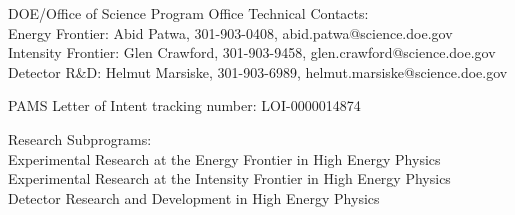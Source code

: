 \begin{center}
DOE/Office of Science Program Office Technical Contacts:  \\
Energy Frontier: Abid Patwa, 301-903-0408, abid.patwa@science.doe.gov \\
Intensity Frontier: Glen Crawford, 301-903-9458, glen.crawford@science.doe.gov  \\
Detector R\&D: Helmut Marsiske, 301-903-6989, helmut.marsiske@science.doe.gov  \\
\vspace*{0.15in}

PAMS Letter of Intent tracking number:  LOI-0000014874
\vspace*{0.15in}

Research Subprograms:  \\
Experimental Research at the Energy Frontier in High Energy Physics  \\
Experimental Research at the Intensity Frontier in High Energy Physics  \\
Detector Research and Development in High Energy Physics  \\

\vspace{.3in}
\end{center}
